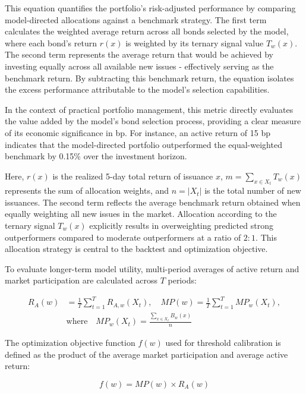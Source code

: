 This equation quantifies the portfolio's risk-adjusted performance by comparing model-directed allocations against a benchmark strategy. The first term calculates the weighted average return across all bonds selected by the model, where each bond's return $r(x)$ is weighted by its ternary signal value $T_w(x)$. The second term represents the average return that would be achieved by investing equally across all available new issues - effectively serving as the benchmark return. By subtracting this benchmark return, the equation isolates the excess performance attributable to the model's selection capabilities.

In the context of practical portfolio management, this metric directly evaluates the value added by the model's bond selection process, providing a clear measure of its economic significance in bp. For instance, an active return of 15 bp indicates that the model-directed portfolio outperformed the equal-weighted benchmark by 0.15\% over the investment horizon.

Here, $r(x)$ is the realized 5-day total return of issuance $x$, $m = \sum_{x \in X_t} T_w(x)$ represents the sum of allocation weights, and $n = |X_t|$ is the total number of new issuances. The second term reflects the average benchmark return obtained when equally weighting all new issues in the market. Allocation according to the ternary signal $T_w(x)$ explicitly results in overweighting predicted strong outperformers compared to moderate outperformers at a ratio of $2:1$. This allocation strategy is central to the backtest and optimization objective.

To evaluate longer-term model utility, multi-period averages of active return and market participation are calculated across $T$ periods:

\begin{equation}
\begin{split}
R_A(w) &= \frac{1}{T}\sum_{t=1}^{T} R_{A,w}(X_t), \quad MP(w) = \frac{1}{T}\sum_{t=1}^{T} MP_w(X_t), \\
&\text{where} \quad MP_w(X_t) = \frac{\sum_{x \in X_t} B_w(x)}{n}
\end{split}
\tag{4.7}
\end{equation}

The optimization objective function $f(w)$ used for threshold calibration is defined as the product of the average market participation and average active return:

\begin{equation}
f(w) = MP(w) \times R_A(w)
\end{equation}

